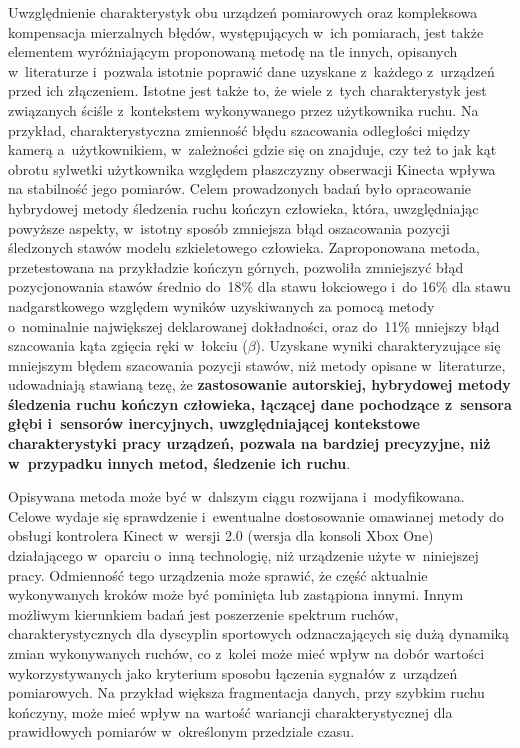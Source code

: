 Uwzględnienie charakterystyk obu urządzeń pomiarowych oraz kompleksowa kompensacja mierzalnych błędów, występujących w~ich pomiarach, jest także elementem wyróżniającym proponowaną metodę na tle innych, opisanych w~literaturze i~pozwala istotnie poprawić dane uzyskane z~każdego z~urządzeń przed ich złączeniem. Istotne jest także to, że wiele z~tych charakterystyk jest związanych ściśle z~kontekstem wykonywanego przez użytkownika ruchu. Na przykład, charakterystyczna zmienność błędu szacowania odległości między kamerą a~użytkownikiem, w~zależności gdzie się on znajduje, czy też to jak kąt obrotu sylwetki użytkownika względem płaszczyzny obserwacji Kinecta wpływa na stabilność jego pomiarów. Celem prowadzonych badań było opracowanie hybrydowej metody śledzenia ruchu kończyn człowieka, która, uwzględniając powyższe aspekty, w~istotny sposób zmniejsza błąd oszacowania pozycji śledzonych stawów modelu szkieletowego człowieka. Zaproponowana metoda, przetestowana na przykładzie kończyn górnych, pozwoliła zmniejszyć błąd pozycjonowania stawów średnio do~18\% dla stawu łokciowego i~do 16\% dla stawu nadgarstkowego względem wyników uzyskiwanych za pomocą metody o~nominalnie największej deklarowanej dokładności, oraz do~11\% mniejszy błąd szacowania kąta zgięcia ręki w~łokciu ($\beta$). Uzyskane wyniki charakteryzujące się mniejszym błędem szacowania pozycji stawów, niż metody opisane w~literaturze, udowadniają stawianą tezę, że \textbf{zastosowanie autorskiej, hybrydowej metody śledzenia ruchu kończyn człowieka, łączącej dane pochodzące z~sensora głębi i~sensorów inercyjnych, uwzględniającej kontekstowe charakterystyki pracy urządzeń, pozwala na bardziej precyzyjne, niż w~przypadku innych metod, śledzenie ich ruchu}.

Opisywana metoda może być w~dalszym ciągu rozwijana i~modyfikowana. Celowe wydaje się sprawdzenie i~ewentualne dostosowanie omawianej metody do obsługi kontrolera Kinect w~wersji 2.0 (wersja dla konsoli Xbox One) działającego w~oparciu o~inną technologię, niż urządzenie użyte w~niniejszej pracy. Odmienność tego urządzenia może sprawić, że część aktualnie wykonywanych kroków może być pominięta lub zastąpiona innymi. Innym możliwym kierunkiem badań jest poszerzenie spektrum ruchów, charakterystycznych dla dyscyplin sportowych odznaczających się dużą dynamiką zmian wykonywanych ruchów, co z~kolei może mieć wpływ na dobór wartości wykorzystywanych jako kryterium sposobu łączenia sygnałów z~urządzeń pomiarowych. Na przykład większa fragmentacja danych, przy szybkim ruchu kończyny, może mieć wpływ na wartość wariancji charakterystycznej dla  prawidłowych pomiarów w~określonym przedziale czasu.

